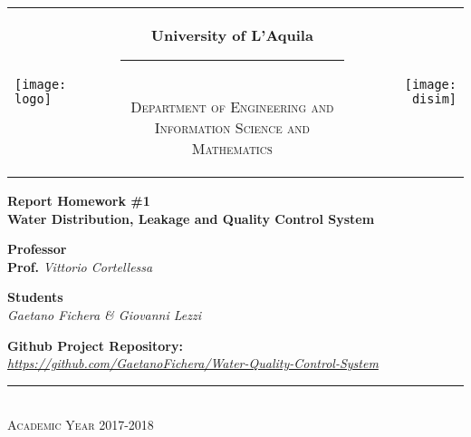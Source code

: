 \begin{titlepage}
\begin{center}
\normalsize

\begin{center}

\begin{tabular}[t]{@{} l @{} c @{} r @{}}
\parbox[c]{0.15\textwidth}{\raggedright \texttt{[image: logo]}}
&
\parbox[c]{0.7\textwidth}
{
\centering \bfseries
University of L'Aquila \\[-5pt]
\rule{0.6\textwidth}{1pt} \\
{\centering \scshape \small Department of Engineering and \\Information Science and Mathematics} \\}
&
\parbox[c]{0.15\textwidth}{\raggedleft \texttt{[image: disim]}}
\end{tabular}
\end{center}

\bigskip \bigskip



\bigskip
\bigskip
\bigskip

\vfil

{\bfseries \large
Report Homework \#1 \\}
{\bfseries \Large
Water Distribution, Leakage and Quality Control System
}

{\large
\bigskip
\bigskip
\bigskip
\bigskip
{\bfseries \large Professor \\ }
\bigskip
\textbf{Prof.} \textit{Vittorio Cortellessa} \\
}

{\large
\bigskip
\bigskip
\bigskip
\bigskip
{\bfseries \large Students \\ }
\bigskip
\textit{Gaetano Fichera \& Giovanni Lezzi} \\
}

\vfil
\vfil

\vspace{2\baselineskip}

{\large
\bigskip
\bigskip
\bigskip
\bigskip
{\bfseries \large Github Project Repository: \\ }
\bigskip
\textit{\href{https://github.com/GaetanoFichera/Water-Quality-Control-System}{https://github.com/GaetanoFichera/Water-Quality-Control-System}} \\
}

\vfil \vfil \vfil

\rule{\textwidth}{1pt}\\
{\scshape Academic Year 2017-2018}

\end{center}
\end{titlepage}